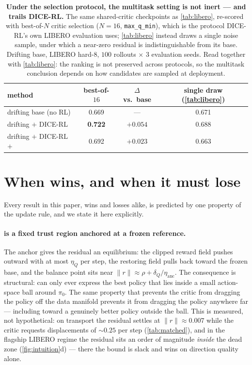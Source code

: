 \begin{table}[h]
\centering
\caption{\textbf{Under the selection protocol, the multitask setting is not
inert --- and \method{} trails DICE-RL.} The same shared-critic checkpoints as
\cref{tab:libero}, re-scored with best-of-$N$ critic selection ($N{=}16$,
\texttt{max\_q\_min}), which is the protocol DICE-RL's own LIBERO evaluation
uses; \cref{tab:libero} instead draws a single noise sample, under which a
near-zero residual is indistinguishable from its base. Drifting base, LIBERO
hard-8, $100$ rollouts $\times$ $3$ evaluation seeds. Read together with
\cref{tab:libero}: the ranking is not preserved across protocols, so the
multitask conclusion depends on how candidates are sampled at deployment.}
\label{tab:multitask-bon}
\small
\begin{tabular}{lccc}
\toprule
method & best-of-$16$ & $\Delta$ vs.\ base & single draw (\cref{tab:libero}) \\
\midrule
drifting base (no RL)             & 0.669 & ---      & 0.671 \\
drifting $+$ DICE-RL              & \textbf{0.722} & $+0.054$ & 0.688 \\
drifting $+$ DICE-RL $+$ \method{} & 0.692 & $+0.023$ & 0.663 \\
\bottomrule
\end{tabular}
\end{table}

\section{When \method{} wins, and when it must lose}
\label{app:regime}

Every result in this paper, wins and losses alike, is predicted by one
property of the update rule, and we state it here explicitly.

\paragraph{\method{} is a fixed trust region anchored at a frozen reference.}
The anchor gives the residual an equilibrium: the clipped reward field pushes
outward with at most $\eta_Q$ per step, the restoring field pulls back toward
the frozen base, and the balance point sits near
$\|r\| \approx \rho + \delta_Q/\eta_{\mathrm{anc}}$. The consequence is
structural: \method{} can only ever express the best policy that lies inside
a small action-space ball around $\pi_0$. The same property that prevents the
critic from dragging the policy off the data manifold prevents it from
dragging the policy anywhere far --- including toward a genuinely better
policy outside the ball. This is measured, not hypothetical: on transport the
residual settles at $\|r\| \approx 0.007$ while the critic requests
displacements of ${\sim}0.25$ per step (\cref{tab:matched}), and in the
flagship LIBERO regime the residual sits an order of magnitude \emph{inside}
the dead zone (\cref{fig:intuition}d) --- there the bound is slack and
\method{} wins on direction quality alone.

